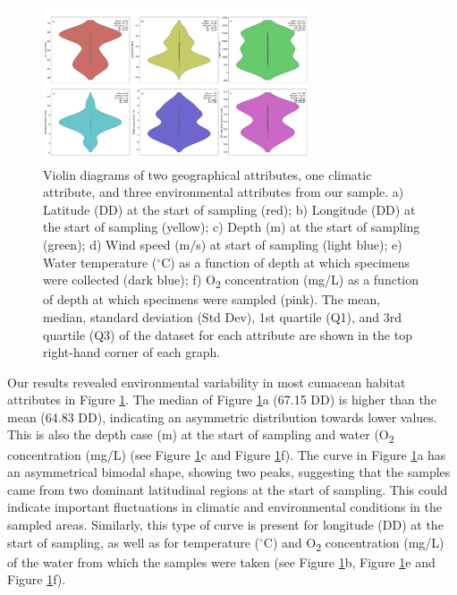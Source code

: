 \begin{figure}[htbp]
    \centering
    \includegraphics[width=0.7\textwidth]{figure1.jpg}
    \caption{Violin diagrams of two geographical attributes, one climatic attribute, and three environmental attributes from our sample. a) Latitude (DD) at the start of sampling (red); b) Longitude (DD) at the start of sampling (yellow); c) Depth (m) at the start of sampling (green); d) Wind speed (m/s) at start of sampling (light blue); e) Water temperature ($^\circ$C) as a function of depth at which specimens were collected (dark blue); f) O\textsubscript{2} concentration (mg/L) as a function of depth at which specimens were sampled (pink). The mean, median, standard deviation (Std Dev), 1st quartile (Q1), and 3rd quartile (Q3) of the dataset for each attribute are shown in the top right-hand corner of each graph. \label{fig:fig2}}
\end{figure}

Our results revealed environmental variability in most cumacean habitat attributes in Figure \ref{fig:fig2}. The median of Figure \ref{fig:fig2}a (67.15 DD) is higher than the mean (64.83 DD), indicating an asymmetric distribution towards lower values. This is also the depth case (m) at the start of sampling and water (O\textsubscript{2} concentration (mg/L) (see Figure \ref{fig:fig2}c and Figure \ref{fig:fig2}f). The curve in Figure \ref{fig:fig2}a has an asymmetrical bimodal shape, showing two peaks, suggesting that the samples came from two dominant latitudinal regions at the start of sampling. This could indicate important fluctuations in climatic and environmental conditions in the sampled areas. Similarly, this type of curve is present for longitude (DD) at the start of sampling, as well as for temperature ($^\circ$C) and O\textsubscript{2} concentration (mg/L) of the water from which the samples were taken (see Figure \ref{fig:fig2}b, Figure \ref{fig:fig2}e and Figure \ref{fig:fig2}f). 

